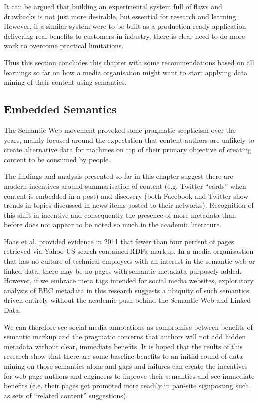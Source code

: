 It can be argued that building an experimental system full of flaws
and drawbacks is not just more desirable, but essential for research
and learning.
However, if a similar system were to be built as a production-ready
application delivering real benefits to customers in industry, there
is clear need to do more work to overcome practical limitations.

Thus this section concludes this chapter with some recommendations
based on all learnings so far on how a media organisation might
want to start applying data mining of their content using semantics.

\subsection{Embedded Semantics}

The Semantic Web movement provoked some pragmatic
scepticism\cite{marshall2003semantic} over the years, mainly focused
around the expectation that content authors are unlikely to create
alternative data for machines on top of their primary objective of
creating content to be consumed by people.

The findings and analysis presented so far in this chapter suggest
there are modern incentives around summarisation of content
(e.g. Twitter ``cards'' when content is embedded in a post) and
discovery (both Facebook and Twitter show trends in topics discussed
in news items posted to their networks). Recognition of this shift
in incentive and consequently the presence of more metadata than
before does not appear to be noted so much in the academic literature.

Haas et al.\cite{haas2011enhanced} provided evidence in 2011 that
fewer than four percent of pages retrieved via Yahoo US search
contained RDFa markup. In a media organisastion that has no culture
of technical employees with an interest in the semantic web or
linked data, there may be no pages with semantic metadata purposely
added. However, if we embrace meta tags intended for social media
websites, exploratory analysis of BBC metadata in this research
suggests a ubiquity of such semantics driven entirely without the
academic push behind the Semantic Web and Linked Data.

We can therefore see social media annotations as compromise between
benefits of semantic markup and the pragmatic concerns that authors
will not add hidden metadata without clear, immediate benefits. It is
hoped that the reults of this research show that there are some
baseline benefits to an initial round of data mining on those
semantics alone and gaps and failures can create the incentives for
web page authors and engineers to improve their semantics and see
immediate benefits (e.e. their pages get promoted more readily in
pan-site signposting such as sets of ``related content'' suggestions).

